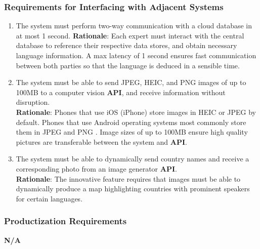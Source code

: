 \subsubsection{Requirements for Interfacing with Adjacent Systems}
\label{ssub:requirements_for_interfacing_with_adjacent_systems}
\begin{enumerate}[{OE-IA}1.]
	\item The system must perform two-way communication with a cloud database in at most 1 second.
	\textbf{Rationale}: Each expert must interact with the central database to reference their respective data stores, and obtain necessary language information. A max latency of 1 second ensures fast communication between both parties so that the language is deduced in a sensible time.   
	\item The system must be able to send JPEG, HEIC, and PNG images of up to 100MB to a computer vision \textbf{API}, and receive information without disruption.
	\\ \textbf{Rationale}: Phones that use iOS (iPhone) store images in HEIC or JPEG by default. Phones that use Android operating systems most commonly store them in JPEG and PNG \cite{Android2025}. Image sizes of up to 100MB ensure high quality pictures are transferable between the system and \textbf{API}.
	\item The system must be able to dynamically send country names and receive a corresponding photo from an image generator \textbf{API}.
	\\ \textbf{Rationale}: The innovative feature requires that images must be able to dynamically produce a map highlighting countries with prominent speakers for certain languages.
\end{enumerate}

\subsubsection{Productization Requirements}
\label{ssub:productization_requirements}
\textbf{N/A}

